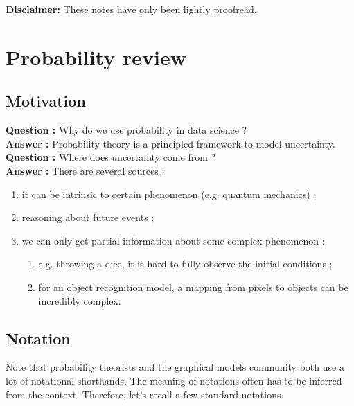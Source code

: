 \documentclass[12pt]{report}
\renewcommand{\emph}[1]{\color{violet}#1\color{black}{}}
\begin{document}
 
 

\maketitle

\textbf{Disclaimer:} These notes have only been lightly proofread.

\section{Probability review}

\subsection{Motivation}

\textbf{Question :} Why do we use probability in data science ?\\
\noindent\textbf{Answer :} Probability theory is a principled framework to model \emph{uncertainty}.\\

\noindent\textbf{Question :} Where does uncertainty come from ?\\
\noindent\textbf{Answer :} There are several sources :
\begin{enumerate}
\item it can be intrinsic to certain phenomenon (e.g. quantum mechanics) ;
\item reasoning about future events ;
\item we can only get partial information about some complex phenomenon :
  \begin{enumerate} \item e.g. throwing a dice, it is hard to fully observe the initial conditions ;
    \item for an object recognition model, a mapping from pixels to objects can be incredibly complex.
  \end{enumerate}
\end{enumerate}

\subsection{Notation}

Note that probability theorists and the graphical models community both use a
lot of notational shorthands. The meaning of notations often has to be inferred
from the context. Therefore, let's recall a few standard notations.
\end{document}
